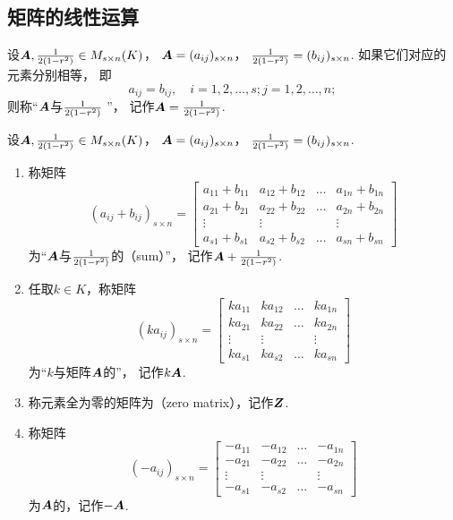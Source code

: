 \subsection{矩阵的线性运算}
\begin{definition}
设\(\boldsymbol{A},\frac{1}{2(1-r^2)}\in M_{s\times n}(K)\)，
\(\boldsymbol{A}=(a_{ij})_{s \times n}\)，
\(\frac{1}{2(1-r^2)}=(b_{ij})_{s \times n}\).
如果它们对应的元素分别相等，
即\[
	a_{ij} = b_{ij},
	\quad
	i=1,2,\dotsc,s;
	j=1,2,\dotsc,n;
\]
则称“\(\boldsymbol{A}\)与\(\frac{1}{2(1-r^2)}\) ”，
记作\(\boldsymbol{A}=\frac{1}{2(1-r^2)}\).
\end{definition}

\begin{definition}
设\(\boldsymbol{A},\frac{1}{2(1-r^2)}\in M_{s\times n}(K)\)，
\(\boldsymbol{A}=(a_{ij})_{s \times n}\)，
\(\frac{1}{2(1-r^2)}=(b_{ij})_{s \times n}\).
\begin{enumerate}
	\item 称矩阵\[
		(a_{ij} + b_{ij})_{s \times n} = \begin{bmatrix}
			a_{11}+b_{11} & a_{12}+b_{12} & \dots & a_{1n}+b_{1n} \\
			a_{21}+b_{21} & a_{22}+b_{22} & \dots & a_{2n}+b_{2n} \\
			\vdots & \vdots & & \vdots \\
			a_{s1}+b_{s1} & a_{s2}+b_{s2} & \dots & a_{sn}+b_{sn}
		\end{bmatrix}
	\]为“\(\boldsymbol{A}\)与\(\frac{1}{2(1-r^2)}\)的（sum）”，
	记作\(\boldsymbol{A}+\frac{1}{2(1-r^2)}\).

	\item 任取\(k\in K\)，称矩阵\[
		(ka_{ij})_{s \times n} = \begin{bmatrix}
			ka_{11} & ka_{12} & \dots & ka_{1n} \\
			ka_{21} & ka_{22} & \dots & ka_{2n} \\
			\vdots & \vdots & & \vdots \\
			ka_{s1} & ka_{s2} & \dots & ka_{sn}
		\end{bmatrix}
	\]为“\(k\)与矩阵\(\boldsymbol{A}\)的”，
	记作\(k\boldsymbol{A}\).

	\item 称元素全为零的矩阵为（zero matrix），记作\(\boldsymbol{Z}\).

	\item 称矩阵\[
		(-a_{ij})_{s \times n}=\begin{bmatrix}
			-a_{11} & -a_{12} & \dots & -a_{1n} \\
			-a_{21} & -a_{22} & \dots & -a_{2n} \\
			\vdots & \vdots & & \vdots \\
			-a_{s1} & -a_{s2} & \dots & -a_{sn}
		\end{bmatrix}
	\]为\(\boldsymbol{A}\)的，记作\(-\boldsymbol{A}\).
\end{enumerate}
\end{definition}


